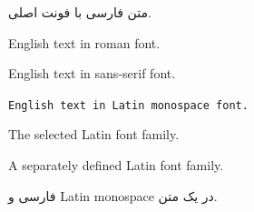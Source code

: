 \documentclass{article}
\begin{document}
    متن فارسی با فونت اصلی.


    English text in roman font.

    \textsf{English text in sans-serif font.}

    \texttt{English text in Latin monospace font.}

    {\latinfont The selected Latin font family.}

    {\customlatinfont A separately defined Latin font family.}


    فارسی و
    {\latinttfamily Latin monospace}
    در یک متن.
\end{document}
